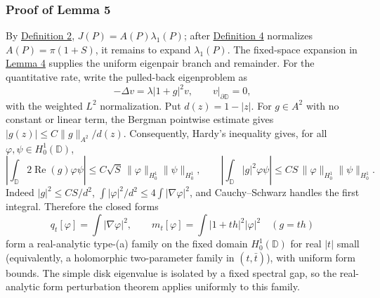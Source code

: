 \documentclass[11pt]{article}
\begin{document}
\subsubsection{Proof of Lemma 5}\label{proof-lem-disk-perturbation}

By \hyperref[def-j-functional]{Definition 2}, \(J(P)=A(P)\lambda_1(P)\);
after \hyperref[def-conformal-data]{Definition 4} normalizes
\(A(P)=\pi(1+S)\), it remains to expand \(\lambda_1(P)\). The
fixed-space expansion in \hyperref[lem-c1-perturbation]{Lemma 4}
supplies the uniform eigenpair branch and remainder. For the
quantitative rate, write the pulled-back eigenproblem as \[
-\Delta v=\lambda|1+g|^2v,\qquad v|_{\partial\mathbb D}=0,
\] with the weighted \(L^2\) normalization. Put \(d(z)=1-|z|\). For
\(g\in A^2\) with no constant or linear term, the Bergman pointwise
estimate gives \(|g(z)|\le C\|g\|_{A^2}/d(z)\). Consequently, Hardy's
inequality gives, for all \(\varphi,\psi\in H^1_0(\mathbb D)\), \[
\left|\int_{\mathbb D}2\operatorname{Re}(g)\varphi\psi\right|\le C\sqrt S\,\|\varphi\|_{H^1_0}\|\psi\|_{H^1_0},\qquad
\left|\int_{\mathbb D}|g|^2\varphi\psi\right|\le CS\,\|\varphi\|_{H^1_0}\|\psi\|_{H^1_0}.
\] Indeed \(|g|^2\le CS/d^2\),
\(\int|\varphi|^2/d^2\le4\int|\nabla\varphi|^2\), and Cauchy--Schwarz
handles the first integral. Therefore the closed forms \[
q_t[\varphi]=\int|\nabla\varphi|^2,\qquad m_t[\varphi]=\int|1+t h|^2|\varphi|^2\quad(g=th)
\] form a real-analytic type-(a) family on the fixed domain
\(H^1_0(\mathbb D)\) for real \(|t|\) small (equivalently, a holomorphic
two-parameter family in \((t,\bar t)\)), with uniform form bounds. The
simple disk eigenvalue is isolated by a fixed spectral gap, so the
real-analytic form perturbation theorem applies uniformly to this
family.
\end{document}
